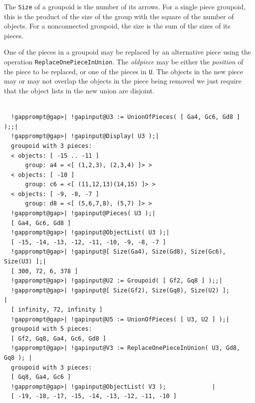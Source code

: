 \documentclass[a4paper,11pt]{report}
\begin{document}
{{{ The \texttt{Size} of a groupoid is the number of its arrows. For a single piece groupoid, this
is the product of the size of the group with the square of the number of
objects. For a non\texttt{}connected groupoid, the size is the sum
of the sizes of its pieces. 

 One of the pieces in a groupoid may be replaced by an alternative piece using
the operation \texttt{ReplaceOnePieceInUnion}. The \emph{old{\textunderscore}piece} may be either the \emph{position} of the piece to be replaced, or one of the pieces in \texttt{U}. The objects in the new piece may or may not overlap the objects in the piece
being removed \texttt{}\texttt{} we just require that
the object lists in the new union are disjoint. 

 }

 
\begin{Verbatim}[commandchars=!@|,fontsize=\small,frame=single,label=Example]
  
  !gapprompt@gap>| !gapinput@U3 := UnionOfPieces( [ Ga4, Gc6, Gd8 ] );;|
  !gapprompt@gap>| !gapinput@Display( U3 );|
  groupoid with 3 pieces:
  < objects: [ -15 .. -11 ]
      group: a4 = <[ (1,2,3), (2,3,4) ]> >
  < objects: [ -10 ]
      group: c6 = <[ (11,12,13)(14,15) ]> >
  < objects: [ -9, -8, -7 ]
      group: d8 = <[ (5,6,7,8), (5,7) ]> >
  !gapprompt@gap>| !gapinput@Pieces( U3 );|
  [ Ga4, Gc6, Gd8 ]
  !gapprompt@gap>| !gapinput@ObjectList( U3 );|
  [ -15, -14, -13, -12, -11, -10, -9, -8, -7 ]
  !gapprompt@gap>| !gapinput@[ Size(Ga4), Size(Gd8), Size(Gc6), Size(U3) ];|
  [ 300, 72, 6, 378 ]
  !gapprompt@gap>| !gapinput@U2 := Groupoid( [ Gf2, Gq8 ] );;|
  !gapprompt@gap>| !gapinput@[ Size(Gf2), Size(Gq8), Size(U2) ];           |
  [ infinity, 72, infinity ]
  !gapprompt@gap>| !gapinput@U5 := UnionOfPieces( [ U3, U2 ] );|
  groupoid with 5 pieces:
  [ Gf2, Gq8, Ga4, Gc6, Gd8 ]
  !gapprompt@gap>| !gapinput@V3 := ReplaceOnePieceInUnion( U3, Gd8, Gq8 ); |
  groupoid with 3 pieces:
  [ Gq8, Ga4, Gc6 ]
  !gapprompt@gap>| !gapinput@ObjectList( V3 );             |
  [ -19, -18, -17, -15, -14, -13, -12, -11, -10 ]
  
\end{Verbatim}
 

}}
\end{document}
